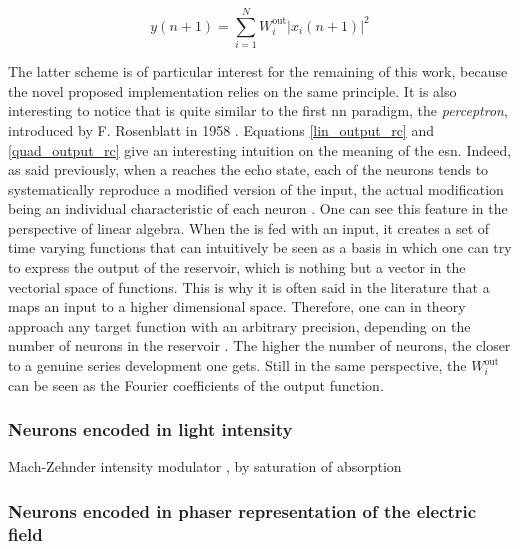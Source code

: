 \begin{equation}
	y(n+1) = \sum_{i=1}^{N} W^{\text{out}}_i |x_i (n+1)|^2
	\label{quad_output_rc}
\end{equation}

The latter scheme is of particular interest for the remaining of this work, because the novel proposed implementation relies on the same principle. It is also interesting to notice that is quite similar to the first \gls{nn} paradigm, the \emph{perceptron}, introduced by F. Rosenblatt in 1958 \cite{Rosenblatt58theperceptron}. Equations \eqref{lin_output_rc} and \eqref{quad_output_rc} give an interesting intuition on the meaning of the \gls{esn}. Indeed, as said previously, when a \rc reaches the echo state, each of the neurons tends to systematically reproduce a modified version of the input, the actual modification being an individual characteristic of each neuron \cite{Jaeger2004}. One can see this feature in the perspective of linear algebra. When the \rcer is fed with an input, it creates a set of time varying functions that can intuitively be seen as a basis in which one can try to express the output of the reservoir, which is nothing but a vector in the vectorial space of functions. This is why it is often said in the literature that a \rcer maps an input to a higher dimensional space. Therefore, one can in theory approach any target function with an arbitrary precision, depending on the number of neurons in the reservoir \cite{Jaeger2004}. The higher the number of neurons, the closer to a genuine series development one gets. Still in the same perspective, the $W^{\text{out}}_i$ can be seen as the Fourier coefficients of the output function.\\


\subsubsection{Neurons encoded in light intensity}

Mach-Zehnder intensity modulator \cite{Paquot2012, Antonik2017, Duport2016}, by saturation of absorption \cite{Dejonckheere2014, Vandoorne2008}


\subsubsection{Neurons encoded in phaser representation of the electric field}

